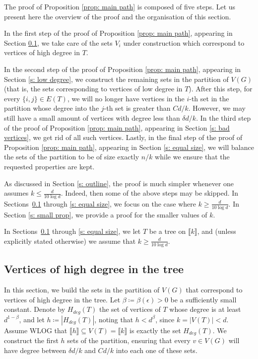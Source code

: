 \documentclass[notitlepage]{scrartcl}
\newcommand{\br}[1]{\llbracket{#1}\rrbracket}
\begin{document}
The proof of Proposition \ref{prop: main path} is composed of five steps. Let us present here the overview of the proof and the organisation of this section.

In the first step of the proof of Proposition \ref{prop: main path}, appearing in Section \ref{s: high deg}, we take care of the sets $V_i$ under construction which correspond to vertices of high degree in $T$.

In the second step of the proof of Proposition \ref{prop: main path}, appearing in Section \ref{s: low degree}, we construct the remaining sets in the partition of $V(G)$ (that is, the sets corresponding to vertices of low degree in $T$). After this step, for every $\{i, j\} \in E(T)$, we will no longer have vertices in the $i$-th set in the partition whose degree into the $j$-th set is greater than $Cd/k$. However, we may still have a small amount of vertices with degree less than $\delta d/k$. In the third step of the proof of Proposition \ref{prop: main path}, appearing in Section \ref{s: bad vertices}, we get rid of all such vertices. Lastly, in the final step of the proof of Proposition \ref{prop: main path}, appearing in Section \ref{s: equal size}, we will balance the sets of the partition to be of size exactly $n/k$ while we ensure that the requested properties are kept. 

As discussed in Section \ref{s: outline}, the proof is much simpler whenever one assumes $k \le \frac{d}{10\log d}$. Indeed, then some of the above steps may be skipped. In Sections~\ref{s: high deg} through \ref{s: equal size}, we focus on the case where $k \ge \frac{d}{10 \log d}$. In Section \ref{s: small prop}, we provide a proof for the smaller values of $k$.

In Sections~\ref{s: high deg} through \ref{s: equal size}, we let $T$ be a tree on $\br{k}$, and (unless explicitly stated otherwise) we assume that $k\ge \frac{d}{10\log d}$. 

\subsection{Vertices of high degree in the tree}\label{s: high deg} 
In this section, we build the sets in the partition of $V(G)$ that correspond to vertices of high degree in the tree. Let $\beta\coloneqq \beta(\epsilon) > 0$ be a sufficiently small constant. Denote by $H_{deg}(T)$ the set of vertices of $T$ whose degree is at least $d^{1-\beta}$, and let $h\coloneqq |H_{deg}(T)|$, noting that $h < d^{\beta}$, since $k=|V(T)|<d$. Assume WLOG that $\br{h} \subseteq V(T) = \br{k}$ is exactly the set $H_{deg}(T)$. We construct the first $h$ sets of the partition, ensuring that every $v\in V(G)$ will have degree between $\delta d/k$ and $Cd/k$ into each one of these sets.
\end{document}
